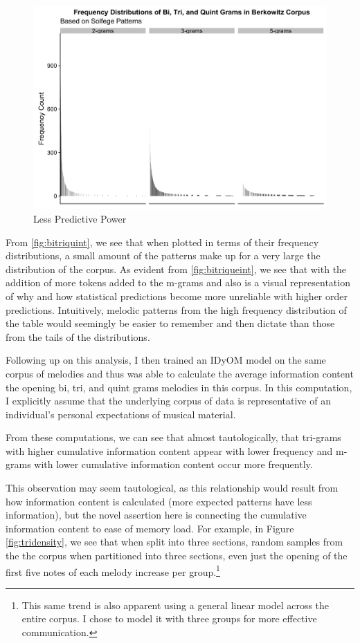 \documentclass[]{book}
\let\rmarkdownfootnote\footnote%
\def\footnote{\protect\rmarkdownfootnote}
\begin{document}
\begin{figure}

{\centering \includegraphics[width=1\linewidth]{img/bitriquint} 

}

\caption{Less Predictive Power}\label{fig:bitriquint2}
\end{figure}

From \ref{fig:bitriquint}, we see that when plotted in terms of their frequency distributions, a small amount of the patterns make up for a very large the distribution of the corpus.
As evident from \ref{fig:bitriqueint}, we see that with the addition of more tokens added to the m-grams and also is a visual representation of why and how statistical predictions become more unreliable with higher order predictions.
Intuitively, melodic patterns from the high frequency distribution of the table would seemingly be easier to remember and then dictate than those from the tails of the distributions.

Following up on this analysis, I then trained an IDyOM model on the same corpus of melodies and thus was able to calculate the average information content the opening bi, tri, and quint grams melodies in this corpus.
In this computation, I explicitly assume that the underlying corpus of data is representative of an individual's personal expectations of musical material.

From these computations, we can see that almost tautologically, that tri-grams with higher cumulative information content appear with lower frequency and m-grams with lower cumulative information content occur more frequently.

This observation may seem tautological, as this relationship would result from how information content is calculated (more expected patterns have less information), but the novel assertion here is connecting the cumulative information content to ease of memory load.
For example, in Figure \ref{fig:tridensity}, we see that when split into three sections, random samples from the the corpus when partitioned into three sections, even just the opening of the first five notes of each melody increase per group.\footnote{This same trend is also apparent using a general linear model across the entire corpus. I chose to model it with three groups for more effective communication.}
\end{document}
